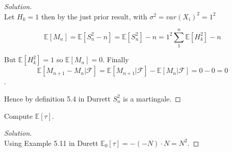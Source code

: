 \documentclass[12pt]{article}
\newenvironment{problem}[2][Problem]{\begin{trivlist}
\item[\hskip \labelsep {\bfseries #1}\hskip \labelsep {\bfseries #2.}]}{\end{trivlist}}
\newenvironment{solution}
  {\begin{proof}[Solution]\renewcommand{\qedsymbol}{}}
  {\end{proof}}
\begin{document}
\begin{solution}\ \\


Let $H_k = 1$ then by the just prior result, with $\sigma^2 = var(X_i)^2 = 1^2$

$$\mathbb{E}[M_n] = \mathbb{E}[S_n^2 - n] = \mathbb{E}[S_n^2] - n = 1^2\sum_1^n\mathbb{E}[H_k^2] - n
$$

But $\mathbb{E}[H_k^2] = 1$ so $\mathbb{E}[M_n] = 0$. Finally
$$\mathbb{E}[M_{n+1} - M_n | \mathcal{F}] = \mathbb{E}[M_{n+1}| \mathcal{F}] - \mathbb{E}[ M_n | \mathcal{F}] = 0-0 = 0$$.

Hence by definition 5.4 in Durrett $S_n^2$ is a martingale.

\end{solution}

\begin{problem}{6(b)}

Compute $\mathbb{E}[\tau]$.

\end{problem}
\begin{solution}\ \\

Using Example 5.11 in Durett $\mathbb{E}_0[\tau] = -(-N)\cdot N = N^2$.

\end{solution}
\end{document}
